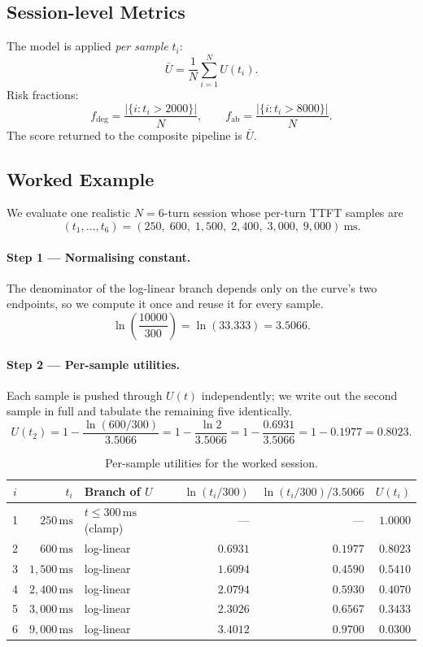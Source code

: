 \documentclass[11pt,a4paper]{article}
\begin{document}
\subsection{Session-level Metrics}

The model is applied \emph{per sample} $t_i$:
\[
  \bar{U} = \frac{1}{N}\sum_{i=1}^{N} U(t_i).
\]
Risk fractions:
\[
  f_{\text{deg}} = \frac{|\{i : t_i > 2000\}|}{N}, \qquad
  f_{\text{ab}} = \frac{|\{i : t_i > 8000\}|}{N}.
\]
The score returned to the composite pipeline is $\bar{U}$.

\subsection{Worked Example}
\label{sec:latency-utility-example}

We evaluate one realistic $N = 6$-turn session whose per-turn TTFT samples
are
\[
  (t_1, \ldots, t_6)
  = (250,\; 600,\; 1{,}500,\; 2{,}400,\; 3{,}000,\; 9{,}000)\ \text{ms}.
\]

\paragraph{Step 1 --- Normalising constant.}
The denominator of the log-linear branch depends only on the curve's two
endpoints, so we compute it once and reuse it for every sample.
\[
  \ln\!\left(\frac{10000}{300}\right) = \ln(33.333) = 3.5066.
\]

\paragraph{Step 2 --- Per-sample utilities.}
Each sample is pushed through $U(t)$ independently; we write out the second
sample in full and tabulate the remaining five identically.
\[
  U(t_2) = 1 - \frac{\ln(600/300)}{3.5066}
         = 1 - \frac{\ln 2}{3.5066}
         = 1 - \frac{0.6931}{3.5066}
         = 1 - 0.1977
         = 0.8023.
\]

\begin{table}[h!]
\centering
\caption{Per-sample utilities for the worked session.}
\label{tab:latency-per-sample}
\begin{tabular}{@{}crlrrr@{}}
\toprule
$i$ & $t_i$ & Branch of $U$ & $\ln(t_i/300)$ & $\ln(t_i/300)/3.5066$ & $U(t_i)$ \\
\midrule
1 & $250\,\text{ms}$   & $t \leq 300\,\text{ms}$ (clamp) & --- & --- & $1.0000$ \\
2 & $600\,\text{ms}$   & log-linear & $0.6931$ & $0.1977$ & $0.8023$ \\
3 & $1{,}500\,\text{ms}$ & log-linear & $1.6094$ & $0.4590$ & $0.5410$ \\
4 & $2{,}400\,\text{ms}$ & log-linear & $2.0794$ & $0.5930$ & $0.4070$ \\
5 & $3{,}000\,\text{ms}$ & log-linear & $2.3026$ & $0.6567$ & $0.3433$ \\
6 & $9{,}000\,\text{ms}$ & log-linear & $3.4012$ & $0.9700$ & $0.0300$ \\
\bottomrule
\end{tabular}
\end{table}
\end{document}
